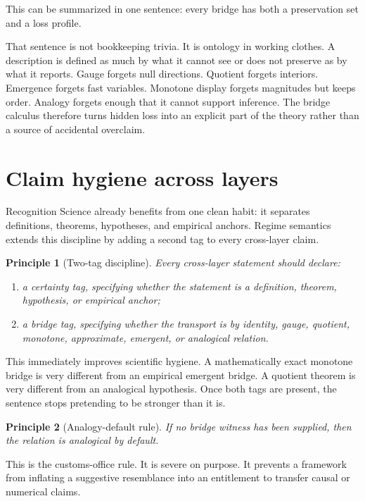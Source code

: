 \documentclass[11pt]{article}
\newtheorem{principle}{Principle}
\begin{document}
This can be summarized in one sentence: every bridge has both a preservation set and a loss profile.

That sentence is not bookkeeping trivia. It is ontology in working clothes. A description is defined as much by what it cannot see or does not preserve as by what it reports. Gauge forgets null directions. Quotient forgets interiors. Emergence forgets fast variables. Monotone display forgets magnitudes but keeps order. Analogy forgets enough that it cannot support inference. The bridge calculus therefore turns hidden loss into an explicit part of the theory rather than a source of accidental overclaim.

\section{Claim hygiene across layers}

Recognition Science already benefits from one clean habit: it separates definitions, theorems, hypotheses, and empirical anchors. Regime semantics extends this discipline by adding a second tag to every cross-layer claim.

\begin{principle}[Two-tag discipline]
Every cross-layer statement should declare:
\begin{enumerate}
    \item a certainty tag, specifying whether the statement is a definition, theorem, hypothesis, or empirical anchor;
    \item a bridge tag, specifying whether the transport is by identity, gauge, quotient, monotone, approximate, emergent, or analogical relation.
\end{enumerate}
\end{principle}

This immediately improves scientific hygiene. A mathematically exact monotone bridge is very different from an empirical emergent bridge. A quotient theorem is very different from an analogical hypothesis. Once both tags are present, the sentence stops pretending to be stronger than it is.

\begin{principle}[Analogy-default rule]
If no bridge witness has been supplied, then the relation is analogical by default.
\end{principle}

This is the customs-office rule. It is severe on purpose. It prevents a framework from inflating a suggestive resemblance into an entitlement to transfer causal or numerical claims.
\end{document}

